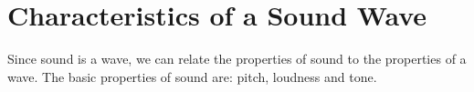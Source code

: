 \section{Characteristics of a Sound Wave}

Since sound is a wave, we can relate the properties of sound to the properties of a wave. The basic properties of sound are: pitch, loudness and tone.


